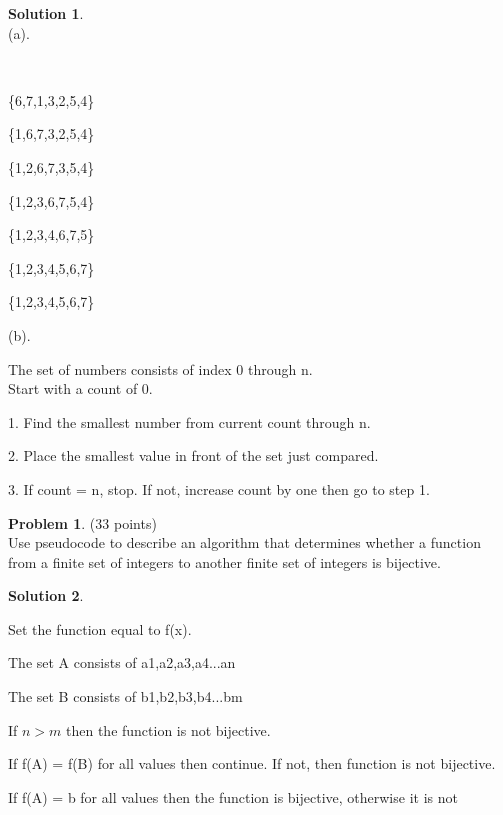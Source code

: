 \documentclass{article}
\theoremstyle{definition}
\newtheorem{problem}{Problem}
\newtheorem*{solution}{Solution}
\begin{document}
\begin{solution}\ \\
(a).
\begin{compactenum}\
\item \{6,7,1,3,2,5,4\}\ \\
\item \{1,6,7,3,2,5,4\}\ \\
\item \{1,2,6,7,3,5,4\}\ \\
\item \{1,2,3,6,7,5,4\}\ \\
\item \{1,2,3,4,6,7,5\}\ \\
\item \{1,2,3,4,5,6,7\}\ \\
\item \{1,2,3,4,5,6,7\}\ \\
\end{compactenum}
(b).
\begin{compactenum}
\indent The set of numbers consists of index 0 through n.\ \\
\indent Start with a count of 0.\ \\
\item 1. Find the smallest number from current count through n.\ \\
\item 2. Place the smallest value in front of the set just compared.\ \\
\item 3. If count = n, stop. If not, increase count by one then go to step 1.\ \\
\end{compactenum}
\end{solution}

\newpage

\begin{problem} (33 points)\\
Use pseudocode to describe an algorithm that determines whether a function from a finite set of integers to another finite set of integers is bijective.
\end{problem}

\begin{solution}\ \\
\begin{compactenum}
\item Set the function equal to f(x).
\item The set A consists of a1,a2,a3,a4...an
\item The set B consists of b1,b2,b3,b4...bm
\item If $n > m$ then the function is not bijective.
\item If f(A) = f(B) for all values then continue. If not, then function is not bijective.
\item If f(A) = b for all values then the function is bijective, otherwise it is not
\end{compactenum}
\end{solution}
\end{document}
